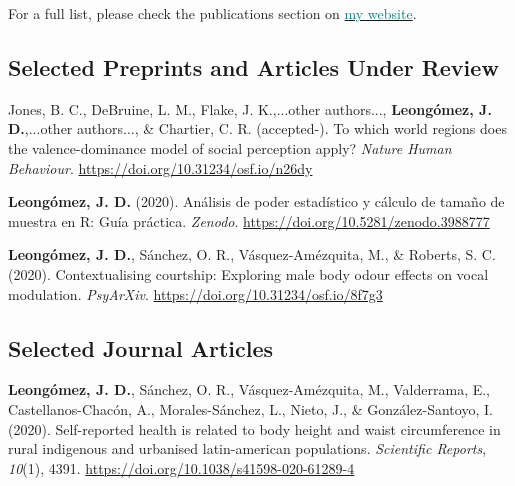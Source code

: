 \documentclass[11pt, a4paper]{awesome-cv}
\begin{document}
For a full list, please check the publications section on \href{https://jdleongomez.info/en/publication/}{\textcolor{teal}{my website}}.

\hypertarget{selected-preprints-and-articles-under-review}{%
\subsection{Selected Preprints and Articles Under Review}\label{selected-preprints-and-articles-under-review}}

\begingroup
\setlength{\parindent}{-0.5in}
\setlength{\leftskip}{0.5in}

\hypertarget{refs_featured_preprint}{}
\leavevmode\hypertarget{ref-Jones2018}{}%
Jones, B. C., DeBruine, L. M., Flake, J. K.,...other authors..., \textbf{Leongómez, J. D.},...other authors..., \& Chartier, C. R. (accepted-). To which world regions does the valence-dominance model of social perception apply? \emph{Nature Human Behaviour}. \url{https://doi.org/10.31234/osf.io/n26dy}

\leavevmode\hypertarget{ref-Leongomez2020a}{}%
\textbf{Leongómez, J. D.} (2020). Análisis de poder estadístico y cálculo de tamaño de muestra en R: Guía práctica. \emph{Zenodo}. \url{https://doi.org/10.5281/zenodo.3988777}

\leavevmode\hypertarget{ref-Leongomez2020}{}%
\textbf{Leongómez, J. D.}, Sánchez, O. R., Vásquez-Amézquita, M., \& Roberts, S. C. (2020). Contextualising courtship: Exploring male body odour effects on vocal modulation. \emph{PsyArXiv}. \url{https://doi.org/10.31234/osf.io/8f7g3}

\endgroup

\hypertarget{selected-journal-articles}{%
\subsection{Selected Journal Articles}\label{selected-journal-articles}}

\begingroup
\setlength{\parindent}{-0.5in}
\setlength{\leftskip}{0.5in}

\hypertarget{refs_featured}{}
\leavevmode\hypertarget{ref-Leonguxf3mez2020}{}%
\textbf{Leongómez, J. D.}, Sánchez, O. R., Vásquez-Amézquita, M., Valderrama, E., Castellanos-Chacón, A., Morales-Sánchez, L., Nieto, J., \& González-Santoyo, I. (2020). Self-reported health is related to body height and waist circumference in rural indigenous and urbanised latin-american populations. \emph{Scientific Reports}, \emph{10}(1), 4391. \url{https://doi.org/10.1038/s41598-020-61289-4}
\end{document}
